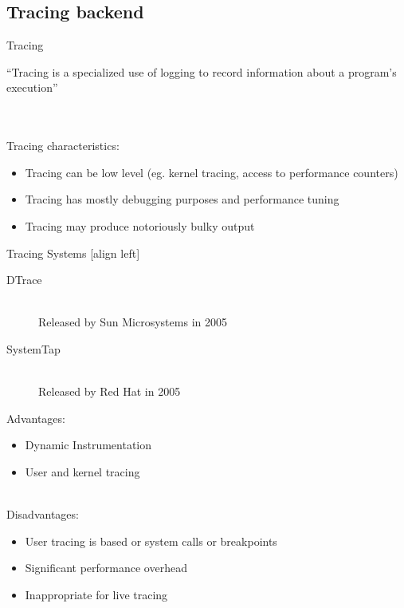 \subsection{Tracing backend}

\begin{frame}{Tracing}
\begin{exampleblock}{}
  {``Tracing is a specialized use of logging to record information about a
program's execution''}
  \vskip5mm
  \hspace*{}
\end{exampleblock}
\hfill \\
\hfill \\
Tracing characteristics:
\begin{itemize}
\item Tracing can be low level (eg. kernel tracing, access to performance
counters)
\item Tracing has mostly debugging purposes and performance tuning
\item Tracing may produce notoriously bulky output
\end{itemize}
\end{frame}

\begin{frame}{Tracing Systems}
[align left]
\begin{description}
\item[DTrace] \hfill \\
Released by Sun Microsystems in 2005
\item[SystemTap] \hfill \\
Released by Red Hat in 2005
\end{description}

Advantages:
\begin{itemize}
\item Dynamic Instrumentation
\item User and kernel tracing
\end{itemize}

\hfill \\
Disadvantages:
\begin{itemize}
\item User tracing is based or system calls or breakpoints
\item Significant performance overhead
\item Inappropriate for live tracing
\end{itemize}
\end{frame}

